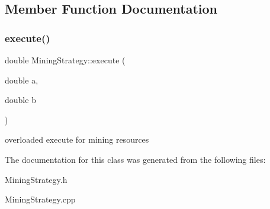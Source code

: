 \subsection{Member Function Documentation}
\mbox{\label{classMiningStrategy_ace2ad68881b60573b90921a8087aee75}} 
\subsubsection{\texorpdfstring{execute()}{execute()}}
{\footnotesize\ttfamily double Mining\+Strategy\+::execute (\begin{DoxyParamCaption}\item[{double}]{a,  }\item[{double}]{b }\end{DoxyParamCaption})\hspace{0.3cm}{\ttfamily [virtual]}}

overloaded execute for mining resources 

The documentation for this class was generated from the following files\+:\begin{DoxyCompactItemize}
\item 
Mining\+Strategy.\+h\item 
Mining\+Strategy.\+cpp\end{DoxyCompactItemize}
